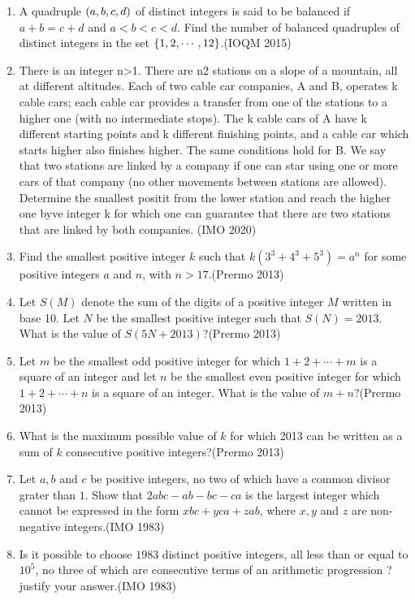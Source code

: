 \begin{enumerate}
    \item A quadruple $\left(a, b, c, d\right)$ of distinct integers is said to be balanced if $a +b = c + d$ and $a < b < c < d$. Find the number of balanced quadruples of distinct integers in the set $\left\{1, 2, \cdots, 12\right\}$.\hfill(IOQM 2015)
     \item There is an integer n\textgreater1. There are n2 stations on a slope of a mountain, all at
different altitudes. Each of two cable car companies, A and B, operates k cable cars; each cable
car provides a transfer from one of the stations to a higher one (with no intermediate stops). The
k cable cars of A have k different starting points and k different finishing points, and a cable car
which starts higher also finishes higher. The same conditions hold for B. We say that two stations
are linked by a company if one can star using
one or more cars of that company (no other movements between stations are allowed).
Determine the smallest positit from the lower station and reach the higher one byve integer k for which one can guarantee that there are two stations
that are linked by both companies.
\hfill(IMO 2020)
\item Find the smallest positive integer $ k $ such that 
$ k(3^3 + 4^3 + 5^3) = a^n $
		for some positive integers $ a $ and $ n $, with $ n > 17 $.\hfill(Prermo 2013)

\item Let $ S(M) $ denote the sum of the digits of a positive integer $ M $ written in base 10. Let $ N $ be the smallest positive integer such that $ S(N) = 2013 $. What is the value of $ S(5N + 2013) $?\hfill(Prermo 2013)

\item Let $ m $ be the smallest odd positive integer for which
$ 1 + 2 + \cdots + m $
is a square of an integer and let $ n $ be the smallest even positive integer for which
$ 1 + 2 + \cdots + n $
is a square of an integer. What is the value of $ m + n $?\hfill(Prermo 2013)

\item What is the maximum possible value of $ k $ for which 2013 can be written as a sum of $ k $ consecutive positive integers?\hfill(Prermo 2013)
\item Let $a,b$ and $c$ be positive integers, no two of which have a common divisor grater than $1$. Show that $2abc-ab-bc-ca$ is the largest integer which cannot be expressed in the form $xbc+yca+zab$, where $x,y$ and $z$ are non-negative integers.\hfill(IMO 1983)

\item Is it possible to choose $1983$ distinct positive integers, all less than or equal to $10^5$, no three of which are consecutive terms of
an arithmetic progression ? justify your answer.\hfill(IMO 1983)


\end{enumerate}
